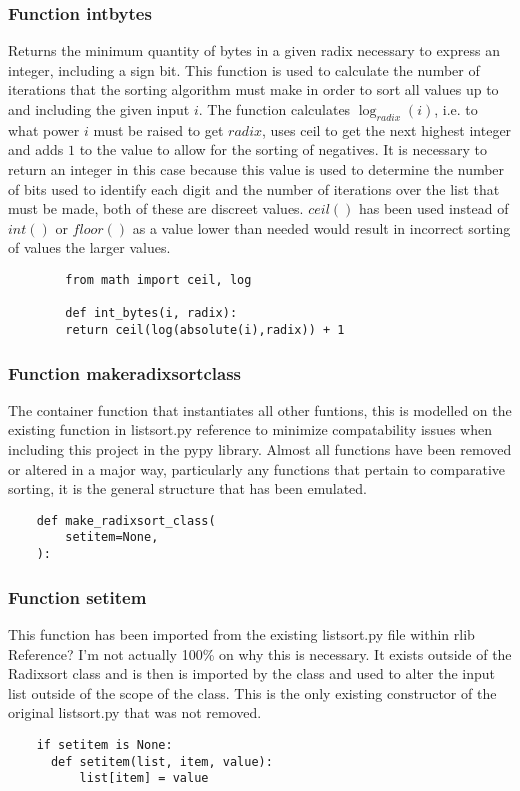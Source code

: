 \documentclass[12pt]{article}
\begin{document}
\subsubsection{Function int\textunderscore bytes}
Returns the minimum quantity of bytes in a given radix necessary to express an integer, including a sign bit. This function is used to calculate the number of iterations that the sorting algorithm must make in order to sort all values up to and including the given input $i$.
\newline
The function calculates  $ \log_{radix}(i)$, i.e. to what power $i$ must be raised to get $radix$, uses ceil to get the next highest integer and adds $1$ to the value to allow for the sorting of negatives. It is necessary to return an integer in this case because this value is used to determine the number of bits used to identify each digit and the number of iterations over the list that must be made, both of these are discreet values. $ceil()$ has been used instead of $int()$ or $floor()$ as a value lower than needed would result in incorrect sorting of values the larger values.
\newline
\begin{lstlisting}
        from math import ceil, log
        
        def int_bytes(i, radix):
        return ceil(log(absolute(i),radix)) + 1
      \end{lstlisting}
\pagebreak
\subsubsection{Function make\textunderscore radixsort\textunderscore class}
The container function that instantiates all other funtions, this is modelled on the existing function in listsort.py {\color{red}reference} to minimize compatability issues when including this project in the pypy library.
\newline
Almost all functions have been removed or altered in a major way, particularly any functions that pertain to comparative sorting, it is the general structure that has been emulated.
\begin{lstlisting}
    def make_radixsort_class(
        setitem=None,
    ):
  \end{lstlisting}
\subsubsection{Function setitem}
This function has been imported from the existing listsort.py file within rlib {\color{red} Reference? I'm not actually 100\% on why this is necessary}. It exists outside of the Radixsort class and is then is imported by the class and used to alter the input list outside of the scope of the class.
\newline
This is the only existing constructor of the original listsort.py that was not removed.
\begin{lstlisting}
    if setitem is None:
      def setitem(list, item, value):
          list[item] = value
  \end{lstlisting}
\end{document}
